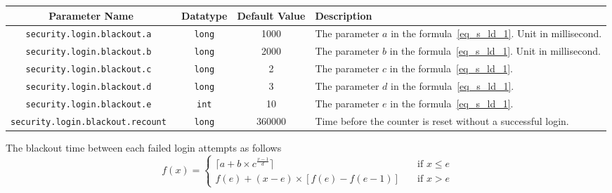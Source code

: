 \documentclass[a4paper,12pt]{report}
\begin{document}
	\begin{tabularx}{\textwidth}{c||c|c|X}
		Parameter Name & Datatype & Default Value & Description\\\hline
		\texttt{security.login.blackout.a }&\texttt{long}& 1000 & The parameter $a$ in the formula~\ref{eq_s_ld_1}. Unit in millisecond.\\
		\texttt{security.login.blackout.b }&\texttt{long}& 2000 &The parameter $b$ in the formula~\ref{eq_s_ld_1}. Unit in millisecond.\\
		\texttt{security.login.blackout.c }&\texttt{long}& 2 &The parameter $c$ in the formula~\ref{eq_s_ld_1}.\\
		\texttt{security.login.blackout.d }&\texttt{long}& 3 &The parameter $d$ in the formula~\ref{eq_s_ld_1}.\\
		\texttt{security.login.blackout.e }&\texttt{int}& 10 &The parameter $e$ in the formula~\ref{eq_s_ld_1}.\\
		\texttt{security.login.blackout.recount }&\texttt{long}& 360000&Time before the counter is reset without a successful login. 
	\end{tabularx}
	
	\medskip
	
	The blackout time between each failed login attempts as follows\label{eq_s_ld_1}
	\begin{equation}
	f(x) = \begin{cases}
	\lceil a + b \times c ^ {\frac{x-1}{d}}\rceil        & \quad \text{if } x \leqslant e\\
	f(e) + (x-e)\times[f(e) - f(e-1)]  & \quad \text{if } x > e
	\end{cases}
	\end{equation}
	
	
\end{document}
